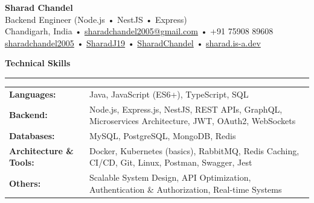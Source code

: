 \documentclass[10pt, letterpaper]{article}
\newcommand{\resumesection}[1]{
    \vspace{6pt}
    {\large \textbf{\textcolor{accent}{#1}}}
    \vspace{1pt}\hrule
    \vspace{4pt}
}
\begin{document}
\begin{center}
    {\Huge \textbf{Sharad Chandel}} \\[2pt]
    {\large Backend Engineer (Node.js • NestJS • Express)} \\[4pt]
     Chandigarh, India •
     \href{mailto:sharadchandel2005@gmail.com}{sharadchandel2005@gmail.com} •
     +91 75908 89608 \\
     \href{https://linkedin.com/in/sharadchandel2005}{sharadchandel2005} •
     \href{https://github.com/SharadJ19}{SharadJ19} •
     \href{https://leetcode.com/u/SharadChandel/}{SharadChandel} •
     \href{http://sharad.is-a.dev/}{sharad.is-a.dev}
\end{center}

\resumesection{Technical Skills}
\begin{tabularx}{\textwidth}{@{}l X@{}}
\textbf{Languages:} & Java, JavaScript (ES6+), TypeScript, SQL \\
\textbf{Backend:} & Node.js, Express.js, NestJS, REST APIs, GraphQL, Microservices Architecture, JWT, OAuth2, WebSockets \\
\textbf{Databases:} & MySQL, PostgreSQL, MongoDB, Redis \\
\textbf{Architecture \& Tools:} & Docker, Kubernetes (basics), RabbitMQ, Redis Caching, CI/CD, Git, Linux, Postman, Swagger, Jest \\
\textbf{Others:} & Scalable System Design, API Optimization, Authentication \& Authorization, Real-time Systems
\end{tabularx}
\end{document}
